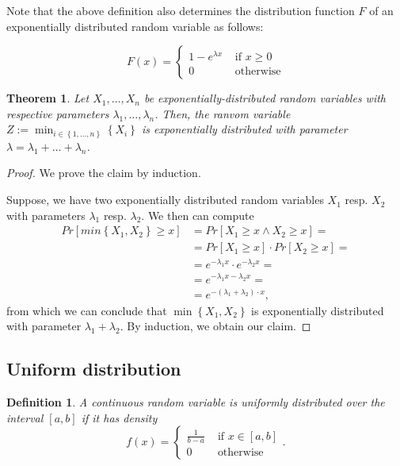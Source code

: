 \documentclass[letter]{report}
\newtheorem{definition}{Definition}[chapter]
\newtheorem{theorem}{Theorem}[chapter]
\newcommand{\p}[1]{Pr\left[#1\right]}
\begin{document}
Note that the above definition also determines the distribution function $F$ of an exponentially distributed random variable as follows:

\begin{equation*}
  F(x) =
  \begin{cases}
    1-e^{\lambda x} & \text{ if } x \geq 0 \\
    0 & \text{ otherwise}
  \end{cases}
\end{equation*}

\begin{theorem}
  Let $X_1,\dots,X_n$ be exponentially-distributed random variables with respective parameters $\lambda_1,\dots,\lambda_n$. Then, the ranvom variable $Z:=\min_{i\in\left\{ 1,\dots,n \right\}} \left\{ X_i \right\}$ is exponentially distributed with parameter $\lambda=\lambda_1+\dots+\lambda_n$.
\end{theorem}

\begin{proof}
  We prove the claim by induction. 

  Suppose, we have two exponentially distributed random variables $X_1$ resp. $X_2$ with parameters $\lambda_1$ resp. $\lambda_2$. We then can compute
  \begin{align*}
    \p{min\left\{ X_1,X_2 \right\} \geq x} & = \p{X_1 \geq x \wedge X_2 \geq x} = \\ 
    & = \p{X_1 \geq x}\cdot\p{X_2 \geq x} = \\
    & = e^{-\lambda_1 x} \cdot e^{-\lambda_2 x} = \\
    & = e^{-\lambda_1 x - \lambda_2 x} = \\
    & = e^{-\left( \lambda_1+\lambda_2 \right) \cdot x},
  \end{align*}
  from which we can conclude that $\min\left\{ X_1,X_2 \right\}$ is exponentially distributed with parameter $\lambda_1 + \lambda_2$. By induction, we obtain our claim.
\end{proof}

\subsection{Uniform distribution}
\label{sec:uniform-distribution}

\begin{definition}
  A continuous random variable is \emph{uniformly distributed} over the interval $\left[ a,b \right]$ if it has density
  \begin{equation*}
    f(x) =
    \begin{cases}
      \frac{1}{b-a} & \text{ if } x\in\left[ a,b \right] \\
      0 & \text{ otherwise}
    \end{cases}.
  \end{equation*}
\end{definition}
\end{document}
